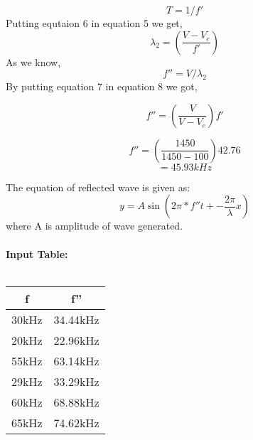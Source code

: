 \documentclass[journal,12pt,twocolumn]{IEEEtran}
\theoremstyle{remark}
\begin{document}
\begin{equation}
T=1/f'
\end{equation}
Putting equtaion 6 in equation 5 we get,
\begin{equation}
\lambda_2=(\frac{V-V_e}{f'})
\end{equation}
As we know,
\begin{equation}
f''=V/\lambda_2
\end{equation}
By putting equation 7 in equation 8 we got,

\begin{equation}
f''=(\frac{V}{V-V_e})f'
\end{equation}

$$f''=(\frac{1450}{1450-100})42.76$$
$$=45.93kHz$$

The equation of reflected wave is given as:
\begin{equation}
y=A\sin(2\pi*f''t+-\frac{2\pi}{\lambda}x)
\end{equation}
where A is amplitude of wave generated.
\\
\\

\textbf{Input Table:}\\
\\
\begin{tabular}{|c|c|}
   \hline
   f & f''\\
   \hline
   30kHz & 34.44kHz\\
   \hline
   20kHz & 22.96kHz\\
   \hline
   55kHz & 63.14kHz\\
   \hline
   29kHz & 33.29kHz\\
   \hline
   60kHz & 68.88kHz\\
   \hline
   65kHz & 74.62kHz\\
   \hline
\end{tabular}
\end{document}
